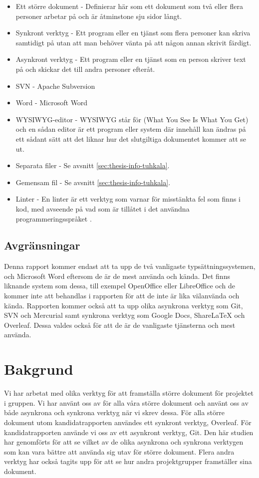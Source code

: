 \begin{itemize}
	\item Ett större dokument - Definierar här som ett dokument som två eller flera personer arbetar på och är åtminstone sju sidor långt.
	\item Synkront verktyg - Ett program eller en tjänst som flera personer kan skriva samtidigt på utan att man behöver vänta på att någon annan skrivit färdigt.
	\item Asynkront verktyg - Ett program eller en tjänst som en person skriver text på och skickar det till andra personer efteråt.
	\item SVN - Apache Subversion
	\item Word - Microsoft Word
	\item WYSIWYG-editor - WYSIWYG står för (What You See Is What You Get) och en sådan editor är ett program eller system där innehåll kan ändras på ett sådant sätt att det liknar hur det slutgiltiga dokumentet kommer att se ut.
	\item Separata filer - Se avsnitt \ref{sec:thesis-info-tuhkala}.
	\item Gemensam fil - Se avsnitt \ref{sec:thesis-info-tuhkala}.
	\item Linter - En linter är ett verktyg som varnar för misstänkta fel som finns i kod, med avseende på vad som är tillåtet i det användna programmeringsspråket \cite{linter}.
\end{itemize}

\subsection{Avgränsningar}
Denna rapport kommer endast att ta upp de två vanligaste typsättningssystemen, \latex och Microsoft Word eftersom de är de mest använda och kända. Det finns liknande system som dessa, till exempel OpenOffice eller LibreOffice och de kommer inte att behandlas i rapporten för att de inte är lika välanvända och kända. Rapporten kommer också att ta upp olika asynkrona verktyg som Git, SVN och Mercurial samt synkrona verktyg som Google Docs, ShareLaTeX och Overleaf. Dessa valdes också för att de är de vanligaste tjänsterna och mest använda.

\section{Bakgrund}
\label{sec:background-tuhkala}
Vi har arbetat med olika verktyg för att framställa större dokument för projektet i gruppen. Vi har använt oss av \latex för alla våra större dokument och använt oss av både asynkrona och synkrona verktyg när vi skrev dessa. För alla större dokument utom kandidatrapporten användes ett synkront verktyg, Overleaf. För kandidatrapporten använde vi oss av ett asynkront verktyg, Git. Den här studien har genomförts för att se vilket av de olika asynkrona och synkrona verktygen som kan vara bättre att använda sig utav för större dokument. Flera andra verktyg har också tagits upp för att se hur andra projektgrupper framställer sina dokument. 

